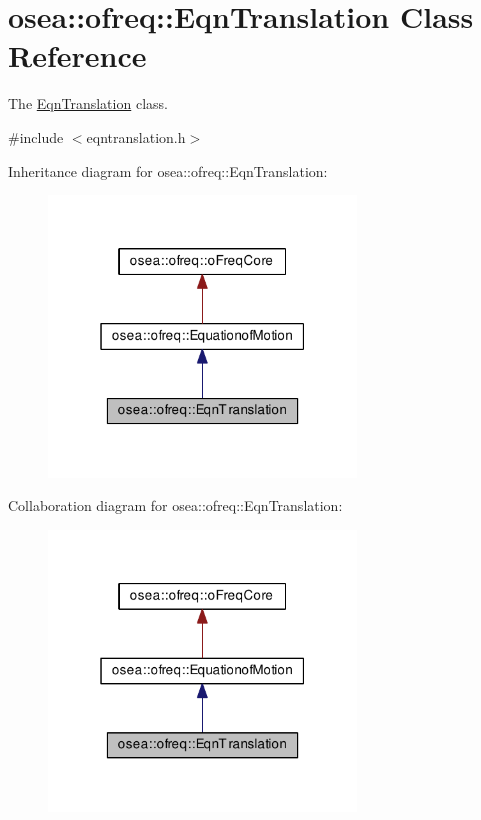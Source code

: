 \hypertarget{classosea_1_1ofreq_1_1_eqn_translation}{\section{osea\-:\-:ofreq\-:\-:Eqn\-Translation Class Reference}
\label{classosea_1_1ofreq_1_1_eqn_translation}
}


The \hyperlink{classosea_1_1ofreq_1_1_eqn_translation}{Eqn\-Translation} class.  




{\ttfamily \#include $<$eqntranslation.\-h$>$}



Inheritance diagram for osea\-:\-:ofreq\-:\-:Eqn\-Translation\-:
\nopagebreak
\begin{figure}[H]
\begin{center}
\leavevmode
\includegraphics[width=232pt]{classosea_1_1ofreq_1_1_eqn_translation__inherit__graph}
\end{center}
\end{figure}


Collaboration diagram for osea\-:\-:ofreq\-:\-:Eqn\-Translation\-:
\nopagebreak
\begin{figure}[H]
\begin{center}
\leavevmode
\includegraphics[width=232pt]{classosea_1_1ofreq_1_1_eqn_translation__coll__graph}
\end{center}
\end{figure}
